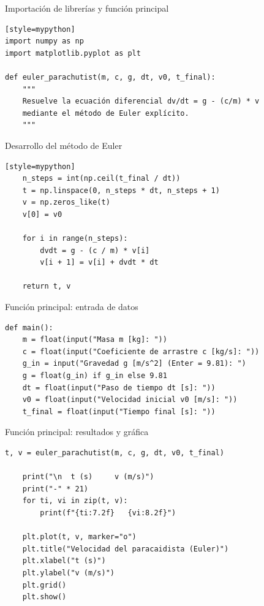 \documentclass[main.tex]{subfiles}
\begin{document}
\begin{frame}[fragile]{Importación de librerías y función principal}
\begin{lstlisting}[style=mypython][style=mypython]
import numpy as np
import matplotlib.pyplot as plt

def euler_parachutist(m, c, g, dt, v0, t_final):
    """
    Resuelve la ecuación diferencial dv/dt = g - (c/m) * v
    mediante el método de Euler explícito.
    """
\end{lstlisting}
\end{frame}

\begin{frame}[fragile]{Desarrollo del método de Euler}
\begin{lstlisting}[style=mypython][style=mypython]
    n_steps = int(np.ceil(t_final / dt))
    t = np.linspace(0, n_steps * dt, n_steps + 1)
    v = np.zeros_like(t)
    v[0] = v0

    for i in range(n_steps):
        dvdt = g - (c / m) * v[i]
        v[i + 1] = v[i] + dvdt * dt

    return t, v
\end{lstlisting}
\end{frame}

\begin{frame}[fragile]{Función principal: entrada de datos}
\begin{lstlisting}[style=mypython]
def main():
    m = float(input("Masa m [kg]: "))
    c = float(input("Coeficiente de arrastre c [kg/s]: "))
    g_in = input("Gravedad g [m/s^2] (Enter = 9.81): ")
    g = float(g_in) if g_in else 9.81
    dt = float(input("Paso de tiempo dt [s]: "))
    v0 = float(input("Velocidad inicial v0 [m/s]: "))
    t_final = float(input("Tiempo final [s]: "))
\end{lstlisting}
\end{frame}

\begin{frame}[fragile]{Función principal: resultados y gráfica}
\begin{lstlisting}[style=mypython]
    t, v = euler_parachutist(m, c, g, dt, v0, t_final)

    print("\n  t (s)     v (m/s)")
    print("-" * 21)
    for ti, vi in zip(t, v):
        print(f"{ti:7.2f}   {vi:8.2f}")

    plt.plot(t, v, marker="o")
    plt.title("Velocidad del paracaidista (Euler)")
    plt.xlabel("t (s)")
    plt.ylabel("v (m/s)")
    plt.grid()
    plt.show()
\end{lstlisting}
\end{frame}
\end{document}
